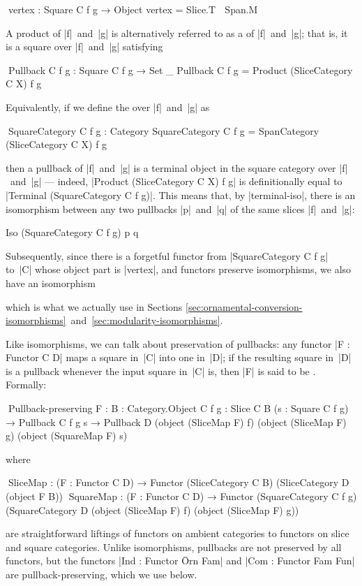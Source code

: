 \begin{code}
^^^vertex : Square C f g → Object
vertex = Slice.T ∘ Span.M
\end{code}
A product of |f|~and~|g| is alternatively referred to as a  of |f|~and~|g|; that is, it is a square over |f|~and~|g| satisfying
\begin{code}
^^^Pullback C f g : Square C f g → Set _
Pullback C f g = Product (SliceCategory C X) f g
\end{code}
Equivalently, if we define the  over |f|~and~|g| as
\begin{code}
^^^SquareCategory C f g : Category
SquareCategory C f g = SpanCategory (SliceCategory C X) f g
\end{code}
then a pullback of |f|~and~|g| is a terminal object in the square category over |f|~and~|g| --- indeed, |Product (SliceCategory C X) f g| is definitionally equal to |Terminal (SquareCategory C f g)|.
This means that, by |terminal-iso|, there is an isomorphism between any two pullbacks |p|~and~|q| of the same slices |f|~and~|g|:
\begin{code}
Iso (SquareCategory C f g) p q
\end{code}
Subsequently, since there is a forgetful functor from |SquareCategory C f g| to~|C| whose object part is |vertex|, and functors preserve isomorphisms, we also have an isomorphism
which is what we actually use in Sections \ref{sec:ornamental-conversion-isomorphisms}~and~\ref{sec:modularity-isomorphisms}.

Like isomorphisms, we can talk about preservation of pullbacks: any functor |F : Functor C D| maps a square in~|C| into one in~|D|; if the resulting square in~|D| is a pullback whenever the input square in~|C| is, then |F| is said to be .
Formally:
\begin{code}
^^^Pullback-preserving F :
  {B : Category.Object C} {f g : Slice C B} (s : Square C f g) →
  Pullback C f g s → Pullback D  (object (SliceMap F) f) (object (SliceMap F) g)
                                 (object (SquareMap F) s)
\end{code}
where
\begin{code}
^^^SliceMap   :  (F : Functor C D) →
                 Functor (SliceCategory C B) (SliceCategory D (object F B))
^^^SquareMap  :  (F : Functor C D) →
                 Functor  (SquareCategory C f g)
                          (SquareCategory D  (object (SliceMap F) f)
                                             (object (SliceMap F) g))
\end{code}
are straightforward liftings of functors on ambient categories to functors on slice and square categories.
Unlike isomorphisms, pullbacks are not preserved by all functors, but the functors |Ind : Functor Ōrn Fam| and |Com : Functor Fam Fun| are pullback-preserving, which we use below.

